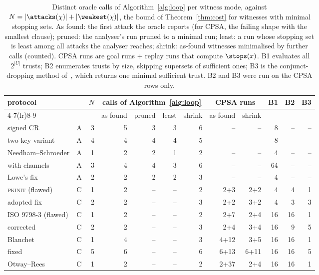 \begin{table}[tbp]
\caption{Distinct oracle calls of Algorithm~\ref{alg:loop} per witness mode, against $N = |\attacks(\chi)| + |\weakest(\chi)|$, the bound of Theorem~\ref{thm:cost} for witnesses with minimal stopping sets. As found: the first attack the oracle reports (for CPSA, the failing shape with the smallest clause); pruned: the analyser's run pruned to a minimal run; least: a run whose stopping set is least among all attacks the analyser reaches; shrink: as-found witnesses minimalised by further calls (counted). CPSA runs are goal runs $+$ replay runs that compute $\stops(x)$. B1 evaluates all $2^{|U|}$ trusts; B2 enumerates trusts by size, skipping supersets of sufficient ones; B3 is the conjunct-dropping method of~\cite{rowe}, which returns one minimal sufficient trust. B2 and B3 were run on the CPSA rows only.}
\label{tab:calls}
\centering
\setlength{\tabcolsep}{3pt}
\footnotesize
\begin{tabular}{l c r r r r r r r r r r}
\toprule
protocol & & $N$ & \multicolumn{4}{c}{calls of Algorithm~\ref{alg:loop}} & \multicolumn{2}{c}{CPSA runs} & B1 & B2 & B3\\
\cmidrule(lr){4-7}\cmidrule(lr){8-9}
 & & & as found & pruned & least & shrink & as found & shrink & & &\\
\midrule
signed CR & A & 3 & 5 & 3 & 3 & 6 & -- & -- & 8 & -- & --\\
\quad two-key variant & A & 4 & 4 & 4 & 4 & 5 & -- & -- & 8 & -- & --\\
Needham--Schroeder & A & 1 & 2 & 2 & 1 & 2 & -- & -- & 4 & -- & --\\
\quad with channels & A & 3 & 4 & 4 & 3 & 6 & -- & -- & 64 & -- & --\\
\quad Lowe's fix & A & 2 & 2 & 2 & 2 & 3 & -- & -- & 4 & -- & --\\
\textsc{pkinit} (flawed) & C & 1 & 2 & -- & -- & 2 & 2{+}3 & 2{+}2 & 4 & 4 & 1\\
\quad adopted fix & C & 2 & 2 & -- & -- & 3 & 2{+}2 & 3{+}2 & 4 & 3 & 3\\
ISO 9798-3 (flawed) & C & 1 & 2 & -- & -- & 2 & 2{+}7 & 2{+}4 & 16 & 16 & 1\\
\quad corrected & C & 2 & 2 & -- & -- & 3 & 2{+}4 & 3{+}4 & 16 & 9 & 5\\
Blanchet & C & 1 & 4 & -- & -- & 3 & 4{+}12 & 3{+}5 & 16 & 16 & 1\\
\quad fixed & C & 5 & 6 & -- & -- & 6 & 6{+}13 & 6{+}11 & 16 & 16 & 5\\
Otway--Rees & C & 1 & 2 & -- & -- & 2 & 2{+}37 & 2{+}4 & 16 & 16 & 1\\

\end{tabular}
\end{table}
